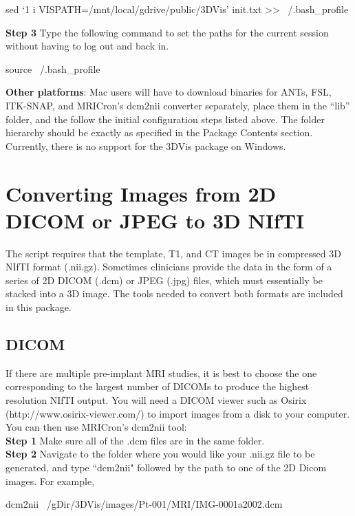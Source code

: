 \documentclass[12pt]{article}
\begin{document}
\begin{verb}
  sed `1 i VISPATH=/mnt/local/gdrive/public/3DVis' init.txt >> ~/.bash_profile
\end{verb}

\textbf{Step 3} Type the following command to set the paths for the current session without having to log out and back in. 

\begin{verb}
  source ~/.bash_profile
\end{verb}

\textbf{Other platforms}: Mac users will have to download binaries for ANTs, FSL, ITK-SNAP, and MRICron's dcm2nii converter separately, place them in the ``lib'' folder, and the follow the initial configuration steps listed above.  The folder hierarchy should be exactly as specified in the Package Contents section. Currently, there is no support for the 3DVis package on Windows.


\section{Converting Images from 2D DICOM or JPEG  to 3D NIfTI}
The script requires that the template, T1, and CT images be in compressed 3D NIfTI format (.nii.gz). Sometimes clinicians provide the data in the form of a series of 2D DICOM (.dcm) or JPEG (.jpg) files, which must essentially be stacked into a 3D image. The tools needed to convert both formats are included in this package.

\subsection*{DICOM}
If there are multiple pre-implant MRI studies, it is best to choose the one corresponding to the largest number of DICOMs to produce the highest resolution NIfTI output. You will need a DICOM viewer such as Osirix (http://www.osirix-viewer.com/) to import images from a disk to your computer. You can then use MRICron's dcm2nii tool: \\
\textbf{Step 1} Make sure all of the .dcm files are in the same folder. \\
\textbf{Step 2} Navigate to the folder where you would like your .nii.gz file to be generated, and type ``dcm2nii" followed by the path to one of the 2D Dicom images. For example, 

\begin{verb}
  dcm2nii ~/gDir/3DVis/images/Pt-001/MRI/IMG-0001a2002.dcm 
\end{verb}
\end{document}

